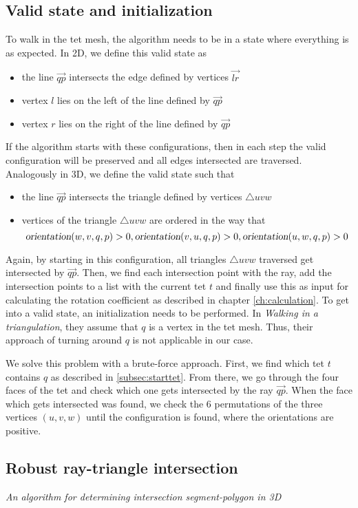 \documentclass[../thesis.tex]{subfiles}
\begin{document}
\subsection{Valid state and initialization}
To walk in the tet mesh, the algorithm needs to be in a state where everything is as expected.
In 2D, we define this valid state as
\begin{itemize}
  \item the line $\Vec{qp}$ intersects the edge defined by vertices $\Vec{lr}$
  \item vertex $l$ lies on the left of the line defined by $\Vec{qp}$
  \item vertex $r$ lies on the right of the line defined by $\Vec{qp}$
\end{itemize}
If the algorithm starts with these configurations, then in each step
the valid configuration will be preserved and all edges intersected are
traversed. 
Analogously in 3D, we define the valid state such that
\begin{itemize}
  \item the line $\Vec{qp}$ intersects the triangle defined by vertices $\triangle uvw$
  \item vertices of the triangle $\triangle uvw$ are ordered in the way that
  $$\textsl{orientation}(w,v,q,p)>0, \textsl{orientation}(v,u,q,p)>0, \textsl{orientation}(u,w,q,p)>0$$
\end{itemize}
Again, by starting in this configuration, all triangles $\triangle uvw$
traversed get intersected by $\Vec{qp}$. Then, we find each
intersection point with the ray, add the intersection points to a list
with the current tet $t$ and finally use this as input for
calculating the rotation coefficient as described in chapter \ref{ch:calculation}.
To get into a valid state, an initialization needs to be performed.
In \emph{Walking in a triangulation}\cite{Devillers}, they assume that
$q$ is a vertex in the tet mesh. Thus, their approach of turning around $q$
is not applicable in our case.

We solve this problem with a brute-force approach.
First, we find which tet $t$ contains $q$ as described in \ref{subsec:starttet}.
From there, we go through the four faces of the tet and check which
one gets intersected by the ray $\Vec{qp}$.
When the face which gets intersected was found,
we check the 6 permutations of the three vertices $(u,v,w)$
until the configuration is found, where the orientations are positive.

\subsection{Robust ray-triangle intersection}
\cite{segura}\emph{An algorithm for determining intersection segment-polygon in 3D}
\end{document}
